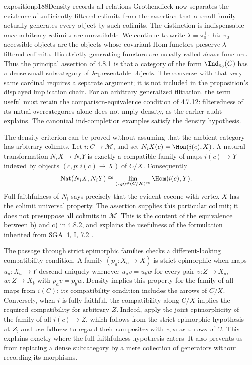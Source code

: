 \begin{dcomment}{exposition}{p188}{Density records all relations}
Grothendieck now separates the existence of sufficiently filtered colimits from the assertion that a small family actually generates every object by such colimits. The distinction is indispensable once arbitrary colimits are unavailable. We continue to write $\lambda=\pi_0^+$: his $\pi_0$-accessible objects are the objects whose covariant Hom functors preserve $\lambda$-filtered colimits. His strictly generating functors are usually called \emph{dense} functors. Thus the principal assertion of 4.8.1 is that a category of the form $\Ind_{\pi_0}(C)$ has a dense small subcategory of $\lambda$-presentable objects. The converse with that very same cardinal requires a separate argument; it is not included in the proposition's displayed implication chain. For an arbitrary generalized filtration, the term useful must retain the comparison-equivalence condition of 4.7.12: filteredness of its initial overcategories alone does not imply density, as the earlier audit explains. The canonical ind-completion examples satisfy the density hypothesis.

The density criterion can be proved without assuming that the ambient category has arbitrary colimits. Let $i:C\to\mathcal M$, and set $N_iX(c)=\Hom(i(c),X)$. A natural transformation $N_iX\to N_iY$ is exactly a compatible family of maps $i(c)\to Y$ indexed by objects $(c,p:i(c)\to X)$ of $C/X$. Consequently
\[
 \operatorname{Nat}(N_iX,N_iY)
 \cong \lim_{(c,p)\in(C/X)^{\mathrm{op}}}\Hom(i(c),Y).
\]
Full faithfulness of $N_i$ says precisely that the evident cocone with vertex $X$ has the colimit universal property. The assertion supplies this particular colimit; it does not presuppose all colimits in $\mathcal M$. This is the content of the equivalence between b) and c) in 4.8.2, and explains the usefulness of the formulation inherited from SGA~4, I, 7.2 \citep{SGA4I1972}.

The passage through strict epimorphic families checks a different-looking compatibility condition. A family $(p_a:X_a\to X)$ is strict epimorphic when maps $u_a:X_a\to Y$ descend uniquely whenever $u_av=u_bw$ for every pair $v:Z\to X_a$, $w:Z\to X_b$ with $p_av=p_bw$. Density implies this property for the family of all maps from $i(C)$: its compatibility condition includes the arrows of $C/X$. Conversely, when $i$ is fully faithful, the compatibility along $C/X$ implies the required compatibility for arbitrary $Z$. Indeed, apply the joint epimorphicity of the family of all $i(c)\to Z$, which follows from the strict epimorphic hypothesis at $Z$, and use fullness to regard their composites with $v,w$ as arrows of $C$. This explains exactly where the full faithfulness hypothesis enters. It also prevents us from replacing a dense subcategory by a mere collection of generators without recording its morphisms.
\end{dcomment}


